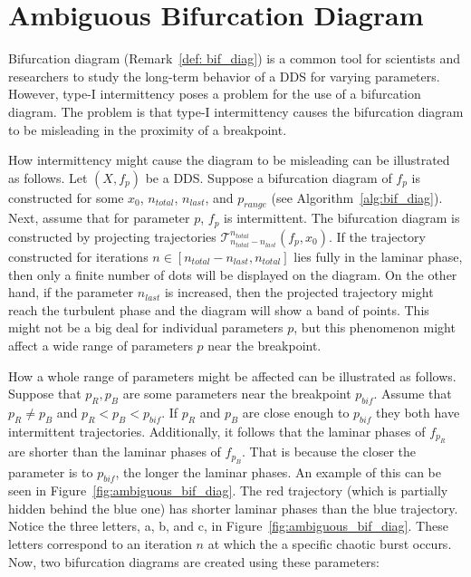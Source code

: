 \section{Ambiguous Bifurcation Diagram}
\label{sec:ambiguous_bif_diag}
Bifurcation diagram (Remark~\ref{def: bif_diag}) is a common tool for scientists and researchers to study the long-term behavior of a DDS for varying parameters.
However, type-I intermittency poses a problem for the use of a bifurcation diagram.
The problem is that type-I intermittency causes the bifurcation diagram to be misleading in the proximity of a breakpoint.
\par
How intermittency might cause the diagram to be misleading can be illustrated as follows.
Let $(X, f_{p})$ be a DDS.
Suppose a bifurcation diagram of $f_{p}$ is constructed for some $x_0$, $n_{total}$, $n_{last}$, and $p_{range}$ (see Algorithm~\ref{alg:bif_diag}).
Next, assume that for parameter $p$, $f_{p}$ is intermittent.
The bifurcation diagram is constructed by projecting trajectories $\mathcal{T}_{n_{total}-n_{last}}^{n_{total}}(f_{p}, x_0)$.
If the trajectory constructed for iterations $n \in [n_{total}-n_{last}, n_{total}]$ lies fully in the laminar phase, then only a finite number of dots will be displayed on the diagram.
On the other hand, if the parameter $n_{last}$ is increased, then the projected trajectory might reach the turbulent phase and the diagram will show a band of points.
This might not be a big deal for individual parameters $p$, but this phenomenon might affect a wide range of parameters $p$ near the breakpoint.
\par
How a whole range of parameters might be affected can be illustrated as follows.
Suppose that $p_{R}, p_{B}$ are some parameters near the breakpoint $p_{bif}$.
Assume that $p_{R} \neq p_{B}$ and $p_{R} < p_{B} < p_{bif}$.
If $p_{R}$ and $p_{B}$ are close enough to $p_{bif}$ they both have intermittent trajectories.
Additionally, it follows that the laminar phases of $f_{p_{R}}$ are shorter than the laminar phases of $f_{p_{B}}$.
That is because the closer the parameter is to $p_{bif}$, the longer the laminar phases.
An example of this can be seen in Figure~\ref{fig:ambiguous_bif_diag}.
The red trajectory (which is partially hidden behind the blue one) has shorter laminar phases than the blue trajectory.
Notice the three letters, a, b, and c, in Figure~\ref{fig:ambiguous_bif_diag}.
These letters correspond to an iteration $n$ at which the a specific chaotic burst occurs.
Now, two bifurcation diagrams are created using these parameters:

